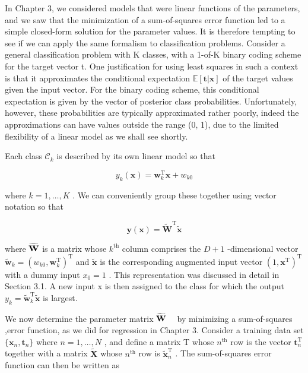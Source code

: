 \documentclass[
  10
]{article}
\begin{document}
In Chapter 3, we considered models that were linear functions of the
parameters, and we saw that the minimization of a sum-of-squares error
function led to a simple closed-form solution for the parameter values.
It is therefore tempting to see if we can apply the same formalism to
classification problems. Consider a general classification problem with
K classes, with a 1-of-K binary coding scheme for the target vector t.
One justification for using least squares in such a context is that it
approximates the conditional expectation
\(\mathbb { E } [ \mathbf { t } | \mathbf { x } ]\) of the target values
given the input vector. For the binary coding scheme, this conditional
expectation is given by the vector of posterior class probabilities.
Unfortunately, however, these probabilities are typically approximated
rather poorly, indeed the approximations can have values outside the
range (0, 1), due to the limited flexibility of a linear model as we
shall see shortly.

Each class \(\mathcal { C } _ { k }\) is described by its own linear
model so that

\[
y _ {k} (\mathbf {x}) = \mathbf {w} _ {k} ^ {\mathrm{T}} \mathbf {x} + w _ {k 0}\tag{4.13}
\]

where \(k = 1 , \ldots , K\) . We can conveniently group these together
using vector notation so that

\[
\mathbf {y} (\mathbf {x}) = \widetilde {\mathbf {W}} ^ {\mathrm{T}} \widetilde {\mathbf {x}}\tag{4.14}
\]

where \(\widetilde { \bf W }\) is a matrix whose
\(k ^ { \mathrm { t h } }\) column comprises the \(D + 1\) -dimensional
vector
\(\widetilde { \mathbf { w } } _ { k } = ( w _ { k 0 } , \mathbf { w } _ { k } ^ { \mathrm { T } } ) ^ { \mathrm { T } }\)
and \(\widetilde { \mathbf { x } }\) is the corresponding augmented
input vector
\(( 1 , \mathbf { x } ^ { \mathrm { T } } ) ^ { \mathrm { T } }\) with a
dummy input \(x _ { 0 } = 1\) . This representation was discussed in
detail in Section 3.1. A new input x is then assigned to the class for
which the output
\(y _ { k } = \widetilde { \mathbf { w } } _ { k } ^ { \mathrm { T } } \widetilde { \mathbf { x } }\)
is largest.

We now determine the parameter matrix \(\widetilde { \bf W }\)  by
minimizing a sum-of-squares ,error function, as we did for regression in
Chapter 3. Consider a training data set
\(\{ \mathbf { x } _ { n } , \mathbf { t } _ { n } \}\) where
\(n = 1 , \ldots , N\) , and define a matrix T whose
\(n ^ { \mathrm { t h } }\) row is the vector
\(\mathbf { t } _ { n } ^ { \mathrm { T } }\) together with a matrix
\(\widetilde { \mathbf { X } }\) whose \(n ^ { \mathrm { t h } }\) row
is \(\widetilde { \mathbf { x } } _ { n } ^ { \mathrm { { T } } }\) .
The sum-of-squares error function can then be written as
\end{document}
